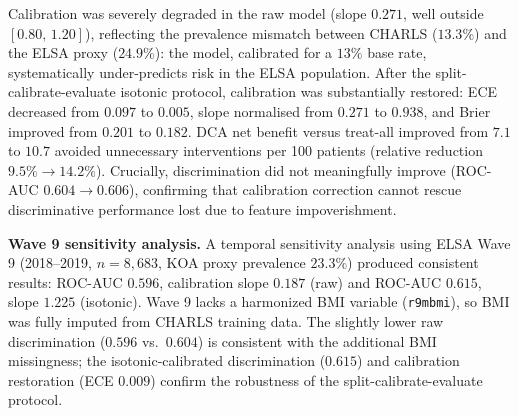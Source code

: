 \documentclass[11pt,a4paper]{article}
\begin{document}
Calibration was severely degraded in the raw model (slope $0.271$, well outside $[0.80,\,1.20]$),
reflecting the prevalence mismatch between CHARLS ($13.3\%$) and the ELSA proxy ($24.9\%$): the
model, calibrated for a $13\%$ base rate, systematically under-predicts risk in the ELSA
population. After the split-calibrate-evaluate isotonic protocol, calibration was substantially
restored: ECE decreased from $0.097$ to $0.005$, slope normalised from $0.271$ to $0.938$, and
Brier improved from $0.201$ to $0.182$. DCA net benefit versus treat-all improved from $7.1$ to
$10.7$ avoided unnecessary interventions per 100 patients (relative reduction $9.5\% \rightarrow
14.2\%$). Crucially, discrimination did not meaningfully improve (ROC-AUC $0.604 \rightarrow
0.606$), confirming that calibration correction cannot rescue discriminative performance lost
due to feature impoverishment.

\textbf{Wave 9 sensitivity analysis.} A temporal sensitivity analysis using ELSA Wave 9
(2018--2019, $n=8{,}683$, KOA proxy prevalence $23.3\%$) produced consistent results:
ROC-AUC $0.596$, calibration slope $0.187$ (raw) and ROC-AUC $0.615$, slope $1.225$ (isotonic).
Wave 9 lacks a harmonized BMI variable (\texttt{r9mbmi}), so BMI was fully imputed from CHARLS
training data. The slightly lower raw discrimination ($0.596$ vs.\ $0.604$) is consistent with
the additional BMI missingness; the isotonic-calibrated discrimination ($0.615$) and calibration
restoration (ECE $0.009$) confirm the robustness of the split-calibrate-evaluate protocol.
\end{document}
